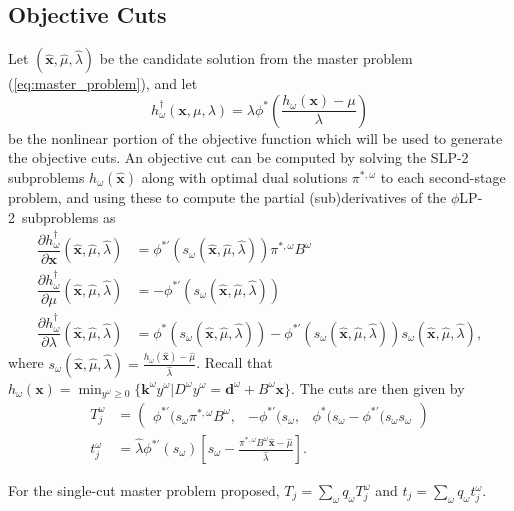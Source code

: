\documentclass[ijoc,letterpaper]{informs3} %
\newcommand{\x}{\mathbf{x}}
\newcommand{\xh}{\hat{\x}}
\newcommand{\lh}{\hat{\lambda}}
\newcommand{\mh}{\hat{\mu}}
\renewcommand{\k}{\mathbf{k}}
\renewcommand{\d}{\mathbf{d}}
\newcommand{\plp}{$\phi$LP-2}
\begin{document}
\subsection{Objective Cuts}

Let $(\xh,\mh, \lh)$ be the candidate solution from the master problem (\ref{eq:master_problem}), and let 
\[
	h^\dagger_\omega(\x,\mu,\lambda) = \lambda \phi^*\left(\frac{h_\omega(\x) - \mu}{\lambda}\right)
\]
be the nonlinear portion of the objective function which will be used to generate the objective cuts.
An objective cut can be computed by solving the SLP-2 subproblems $h_\omega(\xh)$ along with optimal dual solutions $\pi^{*,\omega}$ to each second-stage problem, and using these to compute the partial (sub)derivatives of the \plp\ subproblems as
\begin{align*}
	\dfrac{\partial h^\dagger_\omega}{\partial \x}(\xh,\mh,\lh) & = \phi^{*\prime}(s_\omega(\xh,\mh,\lh)) \pi^{*,\omega}B^\omega \\
	\dfrac{\partial h^\dagger_\omega}{\partial \mu}(\xh,\mh,\lh) & = -\phi^{*\prime}(s_\omega(\xh,\mh,\lh)) \\
	\dfrac{\partial h^\dagger_\omega}{\partial \lambda}(\xh,\mh,\lh) & = \phi^*(s_\omega(\xh,\mh,\lh)) - \phi^{*\prime}(s_\omega(\xh,\mh,\lh))s_\omega(\xh,\mh,\lh),
\end{align*}
where $s_\omega(\xh,\mh,\lh) = \frac{h_\omega(\xh) - \mh}{\lh}$.
Recall that $h_\omega(\x) = \min_{y^\omega \geq 0} \{\k^\omega y^\omega | D^\omega y^\omega = \d^\omega + B^\omega \x\}$.
The cuts are then given by
\begin{align*}
	T_j^\omega & = 
	\left( \begin{array}{ccc}
		\phi^{*\prime}(s_\omega \pi^{*,\omega}B^\omega, 
			 & -\phi^{*\prime}(s_\omega, 
			 & \phi^*(s_\omega - \phi^{*\prime}(s_\omega s_\omega
	\end{array} \right) \\
	t_j^\omega & = \lh \phi^{*\prime}(s_\omega)\left[s_\omega - \frac{\pi^{*,\omega}B^\omega\xh - \mh}{\lh}\right].
\end{align*}

For the single-cut master problem proposed, $T_j = \sum_\omega q_\omega T_j^\omega$ and $t_j = \sum_\omega q_\omega t_j^\omega$.
\end{document}

